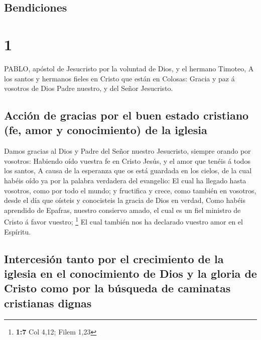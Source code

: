 \hypertarget{bendiciones}{%
\subsection{Bendiciones}\label{bendiciones}}

\hypertarget{section}{%
\section{1}\label{section}}

 PABLO, apóstol de Jesucristo por la voluntad de Dios, y el
hermano Timoteo,  A los santos y hermanos fieles en Cristo
que están en Colosas: Gracia y paz á vosotros de Dios Padre nuestro, y
del Señor Jesucristo.

\hypertarget{acciuxf3n-de-gracias-por-el-buen-estado-cristiano-fe-amor-y-conocimiento-de-la-iglesia}{%
\subsection{Acción de gracias por el buen estado cristiano (fe, amor y
conocimiento) de la
iglesia}\label{acciuxf3n-de-gracias-por-el-buen-estado-cristiano-fe-amor-y-conocimiento-de-la-iglesia}}

 Damos gracias al Dios y Padre del Señor nuestro Jesucristo,
siempre orando por vosotros:  Habiendo oído vuestra fe en
Cristo Jesús, y el amor que tenéis á todos los santos,  A
causa de la esperanza que os está guardada en los cielos, de la cual
habéis oído ya por la palabra verdadera del evangelio:  El
cual ha llegado hasta vosotros, como por todo el mundo; y fructifica y
crece, como también en vosotros, desde el día que oísteis y conocisteis
la gracia de Dios en verdad,  Como habéis aprendido de
Epafras, nuestro consiervo amado, el cual es un fiel ministro de Cristo
á favor vuestro; \footnote{\textbf{1:7} Col 4,12; Filem 1,23}
 El cual también nos ha declarado vuestro amor en el
Espíritu.

\hypertarget{intercesiuxf3n-tanto-por-el-crecimiento-de-la-iglesia-en-el-conocimiento-de-dios-y-la-gloria-de-cristo-como-por-la-buxfasqueda-de-caminatas-cristianas-dignas}{%
\subsection{Intercesión tanto por el crecimiento de la iglesia en el
conocimiento de Dios y la gloria de Cristo como por la búsqueda de
caminatas cristianas
dignas}\label{intercesiuxf3n-tanto-por-el-crecimiento-de-la-iglesia-en-el-conocimiento-de-dios-y-la-gloria-de-cristo-como-por-la-buxfasqueda-de-caminatas-cristianas-dignas}}

